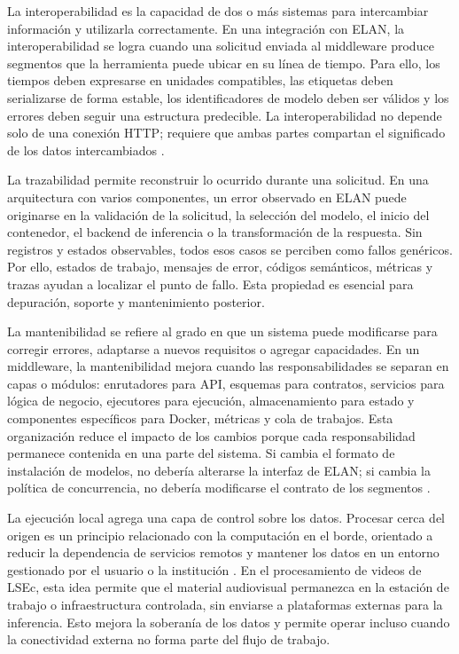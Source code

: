 \documentclass[11pt,a4paper]{article}
\begin{document}
La interoperabilidad es la capacidad de dos o más sistemas para intercambiar información y utilizarla correctamente. En una integración con ELAN, la interoperabilidad se logra cuando una solicitud enviada al middleware produce segmentos que la herramienta puede ubicar en su línea de tiempo. Para ello, los tiempos deben expresarse en unidades compatibles, las etiquetas deben serializarse de forma estable, los identificadores de modelo deben ser válidos y los errores deben seguir una estructura predecible. La interoperabilidad no depende solo de una conexión HTTP; requiere que ambas partes compartan el significado de los datos intercambiados \cite{fielding2000rest}.

La trazabilidad permite reconstruir lo ocurrido durante una solicitud. En una arquitectura con varios componentes, un error observado en ELAN puede originarse en la validación de la solicitud, la selección del modelo, el inicio del contenedor, el backend de inferencia o la transformación de la respuesta. Sin registros y estados observables, todos esos casos se perciben como fallos genéricos. Por ello, estados de trabajo, mensajes de error, códigos semánticos, métricas y trazas ayudan a localizar el punto de fallo. Esta propiedad es esencial para depuración, soporte y mantenimiento posterior.

La mantenibilidad se refiere al grado en que un sistema puede modificarse para corregir errores, adaptarse a nuevos requisitos o agregar capacidades. En un middleware, la mantenibilidad mejora cuando las responsabilidades se separan en capas o módulos: enrutadores para API, esquemas para contratos, servicios para lógica de negocio, ejecutores para ejecución, almacenamiento para estado y componentes específicos para Docker, métricas y cola de trabajos. Esta organización reduce el impacto de los cambios porque cada responsabilidad permanece contenida en una parte del sistema. Si cambia el formato de instalación de modelos, no debería alterarse la interfaz de ELAN; si cambia la política de concurrencia, no debería modificarse el contrato de los segmentos \cite{iso25010}.

La ejecución local agrega una capa de control sobre los datos. Procesar cerca del origen es un principio relacionado con la computación en el borde, orientado a reducir la dependencia de servicios remotos y mantener los datos en un entorno gestionado por el usuario o la institución \cite{shi2016edge}. En el procesamiento de videos de LSEc, esta idea permite que el material audiovisual permanezca en la estación de trabajo o infraestructura controlada, sin enviarse a plataformas externas para la inferencia. Esto mejora la soberanía de los datos y permite operar incluso cuando la conectividad externa no forma parte del flujo de trabajo.
\end{document}
